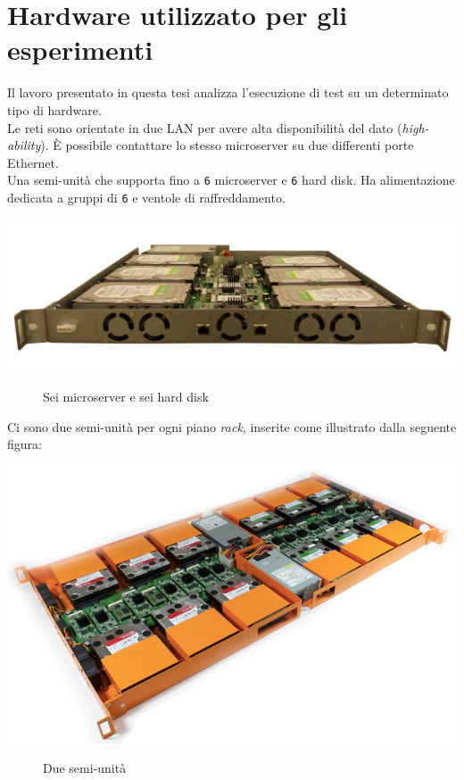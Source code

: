 \item
\section{Hardware utilizzato per gli esperimenti}
Il lavoro presentato in questa tesi analizza l'esecuzione di test su un determinato tipo di hardware.\\

Le reti sono orientate in due LAN per avere alta disponibilit\`{a} del dato (\textit{high-ability}). \`{E} possibile contattare lo stesso microserver su due differenti porte Ethernet.\\
Una semi-unit\`{a} che supporta fino a \verb"6" microserver e \verb"6" hard disk. Ha alimentazione dedicata a gruppi di \verb"6" e ventole di raffreddamento.

\begin{center}
\includegraphics[scale=0.20]{img/CY7.png}\\
\end{center}
\begin{figure}[htbp]
\caption{Sei microserver e sei hard disk \label{figura1.11}}
\end{figure}

Ci sono due semi-unit\`{a} per ogni piano \textit{rack}, inserite come illustrato dalla seguente figura:

\begin{center}
\includegraphics[scale=0.40]{img/CY7x2.png}
\end{center}
\begin{figure}[htbp]
\caption{Due semi-unit\`{a} \label{figura1.10}}
\end{figure}

